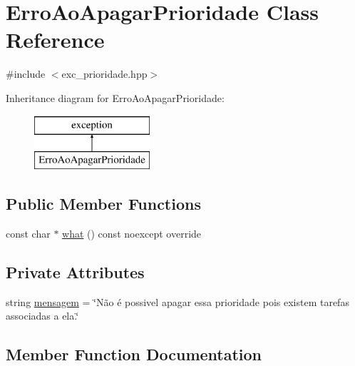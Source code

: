 \hypertarget{classErroAoApagarPrioridade}{}\section{Erro\+Ao\+Apagar\+Prioridade Class Reference}
\label{classErroAoApagarPrioridade}


{\ttfamily \#include $<$exc\+\_\+prioridade.\+hpp$>$}

Inheritance diagram for Erro\+Ao\+Apagar\+Prioridade\+:\begin{figure}[H]
\begin{center}
\leavevmode
\includegraphics[height=2.000000cm]{classErroAoApagarPrioridade}
\end{center}
\end{figure}
\subsection*{Public Member Functions}
\begin{DoxyCompactItemize}
\item 
const char $\ast$ \hyperlink{classErroAoApagarPrioridade_ac6bc1bc5103de9f750fd5bda425db035}{what} () const noexcept override
\end{DoxyCompactItemize}
\subsection*{Private Attributes}
\begin{DoxyCompactItemize}
\item 
string \hyperlink{classErroAoApagarPrioridade_a97a77cb489c4dfea2fcd9084c31633e8}{mensagem} = \char`\"{}Não é possivel apagar essa prioridade pois existem tarefas associadas a ela.\char`\"{}
\end{DoxyCompactItemize}


\subsection{Member Function Documentation}
\mbox{\label{classErroAoApagarPrioridade_ac6bc1bc5103de9f750fd5bda425db035}} 
